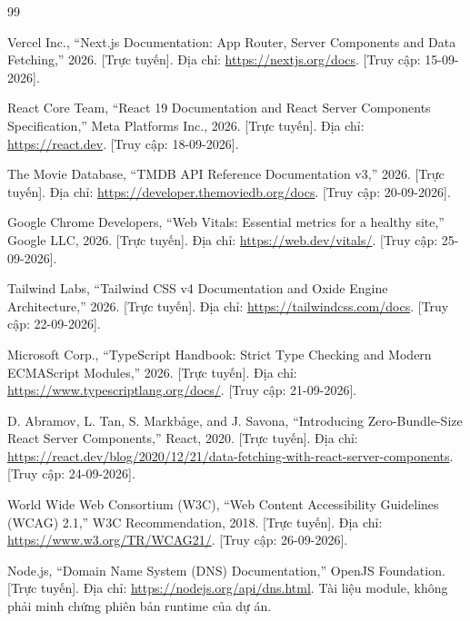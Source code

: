 \documentclass[12pt,a4paper]{extarticle}
\begin{document}
\newpage
\newpage
\begin{thebibliography}{99}
\setlength{\itemsep}{0pt}

Vercel Inc., ``Next.js Documentation: App Router, Server Components and Data Fetching,'' 2026. [Trực tuyến]. Địa chỉ: \url{https://nextjs.org/docs}. [Truy cập: 15-09-2026].

React Core Team, ``React 19 Documentation and React Server Components Specification,'' Meta Platforms Inc., 2026. [Trực tuyến]. Địa chỉ: \url{https://react.dev}. [Truy cập: 18-09-2026].

The Movie Database, ``TMDB API Reference Documentation v3,'' 2026. [Trực tuyến]. Địa chỉ: \url{https://developer.themoviedb.org/docs}. [Truy cập: 20-09-2026].

Google Chrome Developers, ``Web Vitals: Essential metrics for a healthy site,'' Google LLC, 2026. [Trực tuyến]. Địa chỉ: \url{https://web.dev/vitals/}. [Truy cập: 25-09-2026].

Tailwind Labs, ``Tailwind CSS v4 Documentation and Oxide Engine Architecture,'' 2026. [Trực tuyến]. Địa chỉ: \url{https://tailwindcss.com/docs}. [Truy cập: 22-09-2026].

Microsoft Corp., ``TypeScript Handbook: Strict Type Checking and Modern ECMAScript Modules,'' 2026. [Trực tuyến]. Địa chỉ: \url{https://www.typescriptlang.org/docs/}. [Truy cập: 21-09-2026].

D. Abramov, L. Tan, S. Markbåge, and J. Savona, ``Introducing Zero-Bundle-Size React Server Components,'' React, 2020. [Trực tuyến]. Địa chỉ: \url{https://react.dev/blog/2020/12/21/data-fetching-with-react-server-components}. [Truy cập: 24-09-2026].

World Wide Web Consortium (W3C), ``Web Content Accessibility Guidelines (WCAG) 2.1,'' W3C Recommendation, 2018. [Trực tuyến]. Địa chỉ: \url{https://www.w3.org/TR/WCAG21/}. [Truy cập: 26-09-2026].

Node.js, ``Domain Name System (DNS) Documentation,'' OpenJS Foundation. [Trực tuyến]. Địa chỉ: \url{https://nodejs.org/api/dns.html}. Tài liệu module, không phải minh chứng phiên bản runtime của dự án.


\end{thebibliography}
\end{document}
